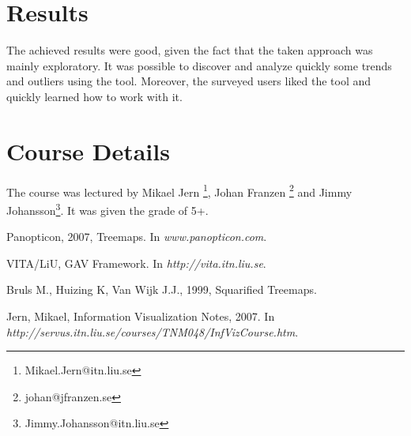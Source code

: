 \documentclass[twocolumn,8pt]{article}
\begin{document}
\section{Results}
The achieved results were good, given the fact that the taken approach was mainly exploratory. It was possible to discover and analyze quickly some trends and outliers using the tool. Moreover, the surveyed users liked the tool and quickly learned how to work with it.

\section{Course Details}
The course was lectured by Mikael Jern \footnote{Mikael.Jern@itn.liu.se}, Johan Franzen \footnote{johan@jfranzen.se} and Jimmy Johansson\footnote{Jimmy.Johansson@itn.liu.se}. It was given the grade of 5+.

\begin{thebibliography}{99}

 Panopticon, 2007, Treemaps. In {\it www.panopticon.com}.

 VITA/LiU, GAV Framework. In {\it http:\slash \slash vita.itn.liu.se}.

 Bruls M., Huizing K, Van Wijk J.J., 1999, Squarified Treemaps.

 Jern, Mikael, Information Visualization Notes, 2007. In {\it http:\slash \slash servus.itn.liu.se\slash courses\slash TNM048\slash InfVizCourse.htm}.

\end{thebibliography}
\end{document}
